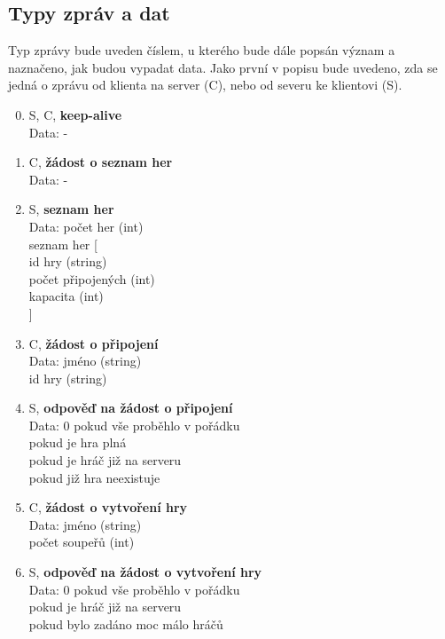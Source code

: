 \documentclass[12pt, a4paper]{article}
\begin{document}
	\subsection{Typy zpráv a dat}
	Typ zprávy bude uveden číslem, u kterého bude dále popsán význam a naznačeno, jak budou vypadat data. Jako první v popisu bude uvedeno, zda se jedná o zprávu od klienta na server (C), nebo od severu ke klientovi (S).
		\begin{enumerate}
		\setcounter{enumi}{-1}
		\item S, C, \textbf{keep-alive}\\
		Data: -
		
		\item C, \textbf{žádost o seznam her}\\
		Data: -
		
		\item S, \textbf{seznam her}\\
		Data: počet her (int)\\
			\null \quad seznam her [\\
			\null \qquad id hry (string)\\
			\null \qquad počet připojených (int)\\
			\null \qquad kapacita (int)\\
			\null \quad ]
			
		\item C, \textbf{žádost o připojení}\\
		Data: jméno (string)\\
			\null \quad id hry (string)
			
		\item S, \textbf{odpověď na žádost o připojení}\\
		Data: 0 pokud vše proběhlo v pořádku\\
			\null {} pokud je hra plná\\
			\null {} pokud je hráč již na serveru\\
			\null {} pokud již hra neexistuje
			
		\item C, \textbf{žádost o vytvoření hry}\\
		Data: jméno (string)\\
			\null \quad počet soupeřů (int)
		
		\item S, \textbf{odpověď na žádost o vytvoření hry}\\
		Data: 0 pokud vše proběhlo v pořádku\\
			\null {} pokud je hráč již na serveru\\
			\null {} pokud bylo zadáno moc málo hráčů
		

\end{enumerate}
\end{document}
